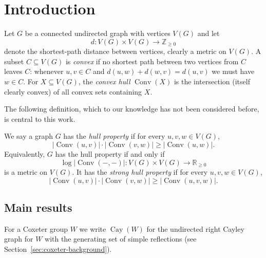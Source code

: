
\DeclareMathOperator{\conv}{Conv}
\DeclareMathOperator{\cay}{Cay}
\DeclareMathOperator{\id}{id}
\newcommand{\Z}{\mathbb{Z}}
\newcommand{\R}{\mathbb{R}}

\section{Introduction}
Let $G$ be a connected undirected graph with vertices $V(G)$ and let
\[
d:V(G)\times V(G)\rightarrow\Z_{\geq0}
\]
denote the shortest-path distance between vertices, clearly a metric on $V(G)$. A subset $C \subseteq V(G)$ is \emph{convex} if no shortest path between two vertices from $C$ leaves $C$: whenever $u,v \in C$ and $d(u,w)+d(w,v)=d(u,v)$ we must have $w \in C$. For $X \subseteq V(G)$, the \textit{convex hull} $\conv(X)$ is the intersection  (itself clearly convex) of all convex sets containing $X$.

The following definition, which to our knowledge has not been considered before, is central to this work.

\begin{defin}
\label{def:metric-property}
We say a graph $G$ has the \textit{hull property} if for every $u,v,w\in V(G)$,
\begin{equation}
\label{eq:hull-property}
\left|\conv(u,v)\right|\cdot \left|\conv(v,w)\right|\geq \left|\conv(u,w)\right|.
\end{equation}
Equivalently, $G$ has the hull property if and only if
\[
\log \left|\conv(-,-)\right|:V(G)\times V(G)\rightarrow\R_{\geq0}
\]
is a metric on $V(G)$.
It has the \textit{strong hull property} if for every $u,v,w\in V(G)$,
\begin{equation}
\label{eq:strong-hull}
\left|\conv(u,v)\right|\cdot\left|\conv(v,w)\right|\geq\left|\conv(u,v,w)\right|.
\end{equation}
\end{defin}

\subsection{Main results}
For a Coxeter group $W$ we write $\cay(W)$ for the undirected right Cayley graph for $W$ with the generating set of simple reflections (see Section~\ref{sec:coxeter-background}).

